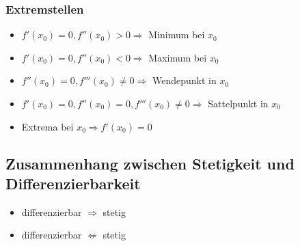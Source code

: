 \subsubsection{Extremstellen}
\begin{itemize}
	\item $f'(x_0) = 0, f''(x_0) > 0 \Rightarrow$ Minimum bei $x_0$
	\item $f'(x_0) = 0, f''(x_0) < 0 \Rightarrow$ Maximum bei $x_0$
	\item $f''(x_0) = 0, f'''(x_0) \neq 0 \Rightarrow$ Wendepunkt in $x_0$
	\item $f'(x_0) = 0, f''(x_0) = 0, f'''(x_0) \neq 0 \Rightarrow$ Sattelpunkt in
  	$x_0$
	\item Extrema bei $x_0 \Rightarrow f'(x_0) = 0$
\end{itemize}

\subsection{Zusammenhang zwischen Stetigkeit und Differenzierbarkeit}
\begin{itemize}
	\item differenzierbar $\Rightarrow$ stetig
	\item differenzierbar $\not\Leftarrow$ stetig
\end{itemize}
